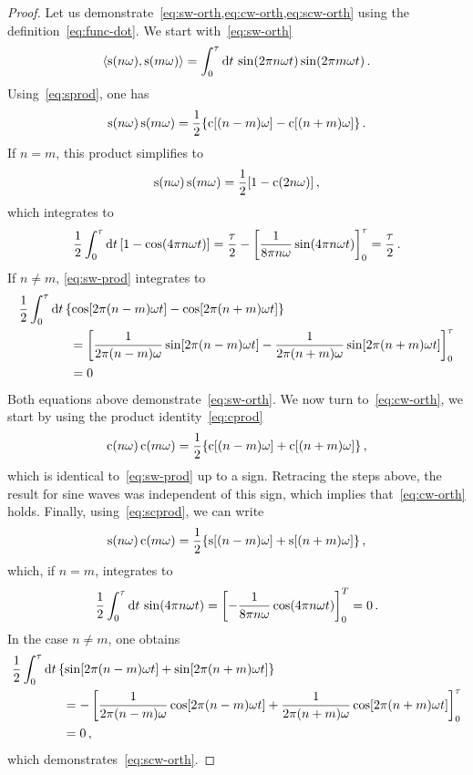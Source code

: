 \begin{proof}
  Let us demonstrate~\cref{eq:sw-orth,eq:cw-orth,eq:scw-orth} using the
  definition~\cref{eq:func-dot}. We start with~\cref{eq:sw-orth}
  \begin{equation}
    \braket{\operatorname{s}(n\omega),\operatorname{s}(m\omega)}=\int_{0}^{\tau}\mathrm{d} t\,
    \sin(2\pi n\omega t)\sin(2\pi m\omega t)\,.
  \end{equation}
  Using~\cref{eq:sprod}, one has
  \begin{equation}
    \operatorname{s}(n\omega)\operatorname{s}(m\omega)=\frac{1}{2}\{\operatorname{c}[(n-m)\omega]-\operatorname{c}[(n+m)\omega]\}\,.
    \label{eq:sw-prod}
  \end{equation}
  If $n=m$, this product simplifies to
  \begin{equation}
    \operatorname{s}(n\omega)\operatorname{s}(m\omega)=\frac{1}{2}[1-\operatorname{c}(2n\omega)]\,,
  \end{equation}
  which integrates to
  \begin{equation}
    \frac{1}{2}\int_{0}^{\tau}\mathrm{d} t\,[1-\cos(4\pi n\omega t)]=\frac{\tau}{2}-
    \left[\frac{1}{8\pi n\omega}\sin(4\pi n\omega t)\right]_0^\tau
    =\frac{\tau}{2}\,.
  \end{equation}
  If $n\neq m$, \cref{eq:sw-prod} integrates to
  \begin{align}
    &\frac{1}{2}\int_{0}^{\tau}\mathrm{d} t\,\{\cos[2\pi(n-m)\omega t]-\cos[2\pi(n+m)\omega t]\}
    \notag\\
    &\qquad\qquad=\left[\frac{1}{2\pi(n-m)\omega}\sin[2\pi(n-m)\omega t]
    -\frac{1}{2\pi(n+m)\omega}\sin[2\pi(n+m)\omega t]\right]_0^\tau\notag\\
    &\qquad\qquad=0
  \end{align}
  Both equations above demonstrate~\cref{eq:sw-orth}. We now turn to~\cref{eq:cw-orth}, we
  start by using the product identity~\cref{eq:cprod}
  \begin{equation}
    \operatorname{c}(n\omega)\operatorname{c}(m\omega)=\frac{1}{2}\{\operatorname{c}[(n-m)\omega]+\operatorname{c}[(n+m)\omega]\}\,,
  \end{equation}
  which is identical to~\cref{eq:sw-prod} up to a sign. Retracing the steps above, the
  result for sine waves was independent of this sign, which implies that~\cref{eq:cw-orth}
  holds. Finally, using~\cref{eq:scprod}, we can write
  \begin{equation}
    \operatorname{s}(n\omega)\operatorname{c}(m\omega)=\frac{1}{2}\{\operatorname{s}[(n-m)\omega]+\operatorname{s}[(n+m)\omega]\}\,,
  \end{equation}
  which, if $n=m$, integrates to
  \begin{equation}
    \frac{1}{2}\int_{0}^{\tau}\mathrm{d} t\,\sin(4\pi n\omega t)=
    \left[-\frac{1}{8\pi n\omega}\cos(4\pi n\omega t)\right]_0^T=0\,.
  \end{equation}
  In the case $n\neq m$, one obtains
  \begin{align}
    &\frac{1}{2}\int_{0}^{\tau}\mathrm{d} t\,\{\sin[2\pi(n-m)\omega t]+\sin[2\pi(n+m)\omega t]\}
    \notag\\
    &\qquad\qquad=-\left[\frac{1}{2\pi(n-m)\omega}\cos[2\pi(n-m)\omega t]
    +\frac{1}{2\pi(n+m)\omega}\cos[2\pi(n+m)\omega t]\right]_0^\tau\notag\\
    &\qquad\qquad=0\,,
  \end{align}
  which demonstrates~\cref{eq:scw-orth}.
\end{proof}
